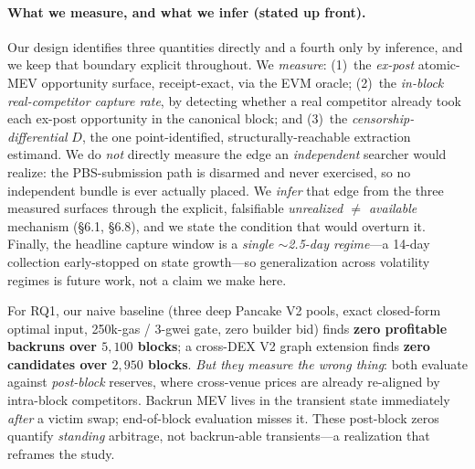 \documentclass[11pt]{article}
\begin{document}
\paragraph{What we measure, and what we infer (stated up front).} Our design identifies
three quantities directly and a fourth only by inference, and we keep that boundary
explicit throughout. We \emph{measure}: (1)~the \emph{ex-post} atomic-MEV opportunity
surface, receipt-exact, via the EVM oracle; (2)~the \emph{in-block real-competitor
capture rate}, by detecting whether a real competitor already took each ex-post
opportunity in the canonical block; and (3)~the \emph{censorship-differential} $D$, the
one point-identified, structurally-reachable extraction estimand. We do \emph{not}
directly measure the edge an \emph{independent} searcher would realize: the
PBS-submission path is disarmed and never exercised, so no independent bundle is ever
actually placed. We \emph{infer} that edge from the three measured surfaces through the
explicit, falsifiable \emph{unrealized $\neq$ available} mechanism (\S6.1, \S6.8), and we
state the condition that would overturn it. Finally, the headline capture window is a
\emph{single $\sim$2.5-day regime}---a 14-day collection early-stopped on state
growth---so generalization across volatility regimes is future work, not a claim we make
here.

For RQ1, our naive baseline (three deep Pancake V2 pools, exact closed-form optimal
input, 250k-gas / 3-gwei gate, zero builder bid) finds \textbf{zero profitable
backruns over $5{,}100$ blocks}; a cross-DEX V2 graph extension finds \textbf{zero
candidates over $2{,}950$ blocks}. \emph{But they measure the wrong thing}: both
evaluate against \emph{post-block} reserves, where cross-venue prices are already
re-aligned by intra-block competitors. Backrun MEV lives in the transient state
immediately \emph{after} a victim swap; end-of-block evaluation misses it. These
post-block zeros quantify \emph{standing} arbitrage, not backrun-able
transients---a realization that reframes the study.
\end{document}
